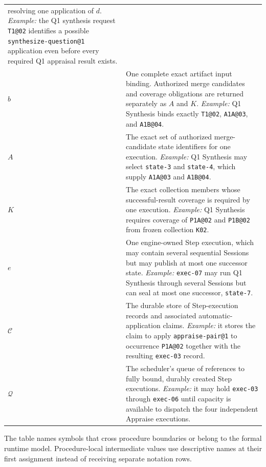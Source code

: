 \documentclass[11pt]{article}
\begin{document}
\begin{tabularx}{\textwidth}{@{}L{0.68in}Y@{}}
resolving one application of \(d\). \newline\emph{Example:} the Q1 synthesis request
\texttt{T1@02} identifies a possible \texttt{synthesize-question@1}
application even before every required Q1 appraisal result exists. \\
\(b\) & One complete exact artifact input binding. Authorized merge candidates
and coverage obligations are returned separately as \(A\) and \(K\).
\newline\emph{Example:} Q1 Synthesis binds exactly \texttt{T1@02},
\texttt{A1A@03}, and \texttt{A1B@04}. \\
\(A\) & The exact set of authorized merge-candidate state identifiers for one
execution. \newline\emph{Example:} Q1 Synthesis may select \texttt{state-3} and
\texttt{state-4}, which supply \texttt{A1A@03} and \texttt{A1B@04}. \\
\(K\) & The exact collection members whose successful-result coverage is
required by one execution. \newline\emph{Example:} Q1 Synthesis requires
coverage of \texttt{P1A@02} and \texttt{P1B@02} from frozen collection
\texttt{K02}. \\
\(e\) & One engine-owned Step execution, which may contain several sequential
Sessions but may publish at most one successor state. \newline\emph{Example:}
\texttt{exec-07} may run Q1 Synthesis through several Sessions but can seal at
most one successor, \texttt{state-7}. \\
\(\mathcal{C}\) & The durable store of Step-execution records and associated
automatic-application claims. \newline\emph{Example:} it stores the claim to
apply \texttt{appraise-pair@1} to occurrence \texttt{P1A@02} together with the
resulting \texttt{exec-03} record. \\
\(\mathcal{Q}\) & The scheduler's queue of references to fully bound, durably
created Step executions. \newline\emph{Example:} it may hold \texttt{exec-03}
through \texttt{exec-06} until capacity is available to dispatch the four
independent Appraise executions. \\
\bottomrule
\end{tabularx}

The table names symbols that cross procedure boundaries or belong to the
formal runtime model. Procedure-local intermediate values use descriptive
names at their first assignment instead of receiving separate notation rows.
\end{document}
